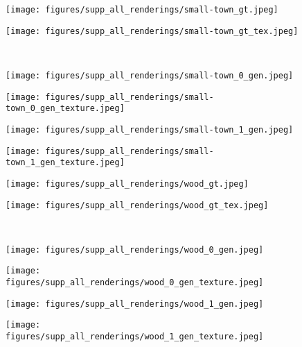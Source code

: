 \begin{figure*}[!h]
\begin{subfigure}{.16\linewidth}
    \end{subfigure}
    \begin{subfigure}{.16\linewidth}
        \centering
        \texttt{[image: figures/supp\_all\_renderings/small-town\_gt.jpeg]}
    \end{subfigure}
    \begin{subfigure}{.16\linewidth}
        \centering
        \texttt{[image: figures/supp\_all\_renderings/small-town\_gt\_tex.jpeg]}
    \end{subfigure}
    \unskip\ \vrule\ 
    \begin{subfigure}{.16\linewidth}
        \centering
        \texttt{[image: figures/supp\_all\_renderings/small-town\_0\_gen.jpeg]}
    \end{subfigure}
    \begin{subfigure}{.16\linewidth}
        \centering
        \texttt{[image: figures/supp\_all\_renderings/small-town\_0\_gen\_texture.jpeg]}
    \end{subfigure}
    \begin{subfigure}{.16\linewidth}
        \centering
        \texttt{[image: figures/supp\_all\_renderings/small-town\_1\_gen.jpeg]}
    \end{subfigure}
    \begin{subfigure}{.16\linewidth}
        \centering
        \texttt{[image: figures/supp\_all\_renderings/small-town\_1\_gen\_texture.jpeg]}
    \end{subfigure}
    \begin{subfigure}{.16\linewidth}
        \centering
        \texttt{[image: figures/supp\_all\_renderings/wood\_gt.jpeg]}
    \end{subfigure}
    \begin{subfigure}{.16\linewidth}
        \centering
        \texttt{[image: figures/supp\_all\_renderings/wood\_gt\_tex.jpeg]}
    \end{subfigure}
    \unskip\ \vrule\ 
    \begin{subfigure}{.16\linewidth}
        \centering
        \texttt{[image: figures/supp\_all\_renderings/wood\_0\_gen.jpeg]}
    \end{subfigure}
    \begin{subfigure}{.16\linewidth}
        \centering
        \texttt{[image: figures/supp\_all\_renderings/wood\_0\_gen\_texture.jpeg]}
    \end{subfigure}
    \begin{subfigure}{.16\linewidth}
        \centering
        \texttt{[image: figures/supp\_all\_renderings/wood\_1\_gen.jpeg]}
    \end{subfigure}
    \begin{subfigure}{.16\linewidth}
        \centering
        \texttt{[image: figures/supp\_all\_renderings/wood\_1\_gen\_texture.jpeg]}
    \end{subfigure}
        \vspace*{-5mm} 


\end{figure*}

